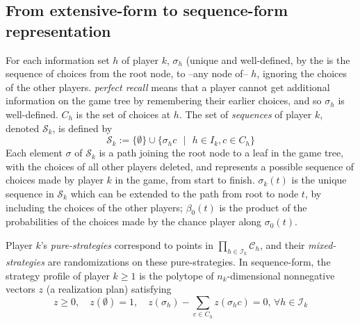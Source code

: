 \documentclass{article} %
\begin{document}
\subsection{From extensive-form to sequence-form representation}
For each information set $h$ of player $k$, $\sigma_h$ (unique and well-defined, by the  is the sequence of choices from the root node, to --any node of-- $h$, ignoring the choices of the other players. \textit{perfect recall} means that a player cannot get additional information on the game tree by remembering their earlier choices, and so $\sigma_h$ is well-defined. $C_h$ is the set of choices at $h$. The set of \textit{sequences} of player $k$, denoted $\mathcal{S}_k$, is defined by 
\begin{equation}
\mathcal{S}_k := \{\emptyset\} \cup \{\sigma_h c\text{ } |\text{ } h \in I_k, c \in C_h\}
\end{equation}
Each element $\sigma$ of $\mathcal{S}_k$ is a path joining the root node to a leaf in the game tree, with the choices of all other players deleted, and represents a possible sequence of choices made by player $k$ in the game, from start to finish. $\sigma_k(t)$ is the unique sequence in $\mathcal{S}_k$ which can be extended to the path from root to node $t$, by including the choices of the other players;
$\beta_0(t)$ is the product of the probabilities of the choices made by the chance player along $\sigma_0(t)$.

Player $k$'s \textit{pure-strategies} correspond to points in $\prod_{h \in \mathcal{I}_k}{\mathcal{C}_h}$, and their \textit{mixed-strategies} are randomizations on these pure-strategies. In sequence-form, the strategy profile of player $k \ge 1$ is the polytope of $n_k$-dimensional nonnegative vectors $z$ (a realization plan) satisfying
\begin{equation}
  z \geq 0,\hspace{1em}z(\emptyset) = 1,\hspace{1em}
    z(\sigma_h) - \sum_{c \in C_h}{z(\sigma_h c)} = 0\text{, } \forall h \in \mathcal{I}_k
  \label{eq:lin}
\end{equation}
\end{document}
